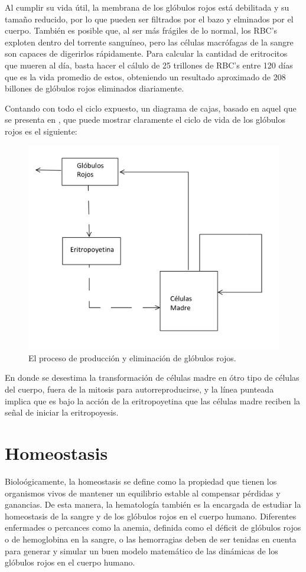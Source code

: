 Al cumplir su vida útil, la membrana de los glóbulos rojos está debilitada y su tamaño reducido, por lo que pueden ser filtrados por el bazo y elminados por el cuerpo. También es posible que, al ser más frágiles de lo normal, los RBC's exploten dentro del torrente sanguíneo, pero las células macrófagas de la sangre son capaces de digerirlos rápidamente. Para calcular la cantidad de eritrocitos que mueren al día, basta hacer el cálulo de 25 trillones de RBC's entre 120 días que es la vida promedio de estos, obteniendo un resultado aproximado de 208 billones de glóbulos rojos eliminados diariamente.

Contando con todo el ciclo expuesto, un diagrama de cajas, basado en aquel que se presenta en \cite{kirk1968mathematical}, que puede mostrar claramente el ciclo de vida de los glóbulos rojos es el siguiente:
\begin{figure}[H]
    \centering
    \includegraphics[scale=0.3]{figures/VidaRBC.jpeg}
    \caption{El proceso de producción y eliminación de glóbulos rojos.}
    \label{sec:RBC:fig:VidaRBC}
\end{figure}

En donde se desestima la transformación de células madre en ótro tipo de células del cuerpo, fuera de la mitosis para autorreproducirse, y la línea punteada implica que es bajo la acción de la eritropoyetina que las células madre reciben la señal de iniciar la eritropoyesis.

\section{Homeostasis}\label{sec:RBC:homeostasis}

Bioloógicamente, la homeostasis se define como la propiedad que tienen los organismos vivos de mantener un equilibrio estable al compensar pérdidas y ganancias. De esta manera, la hematología también es la encargada de estudiar la homeostasis de la sangre y de los glóbulos rojos en el cuerpo humano. Diferentes enfermades o percances como la anemia, definida como el déficit de glóbulos rojos o de hemoglobina en la sangre, o las hemorragias deben de ser tenidas en cuenta para generar y simular un buen modelo matemático de las dinámicas de los glóbulos rojos en el cuerpo humano.
